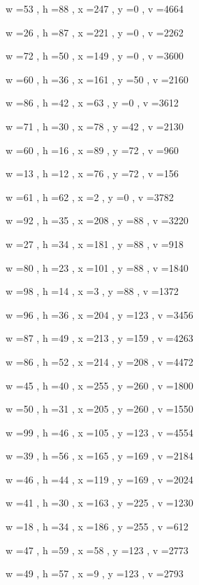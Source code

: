 \documentclass[11pt]{article}
\begin{document}
w =53 , h =88 , x =247 , y =0 , v =4664
\par
w =26 , h =87 , x =221 , y =0 , v =2262
\par
w =72 , h =50 , x =149 , y =0 , v =3600
\par
w =60 , h =36 , x =161 , y =50 , v =2160
\par
w =86 , h =42 , x =63 , y =0 , v =3612
\par
w =71 , h =30 , x =78 , y =42 , v =2130
\par
w =60 , h =16 , x =89 , y =72 , v =960
\par
w =13 , h =12 , x =76 , y =72 , v =156
\par
w =61 , h =62 , x =2 , y =0 , v =3782
\par
w =92 , h =35 , x =208 , y =88 , v =3220
\par
w =27 , h =34 , x =181 , y =88 , v =918
\par
w =80 , h =23 , x =101 , y =88 , v =1840
\par
w =98 , h =14 , x =3 , y =88 , v =1372
\par
w =96 , h =36 , x =204 , y =123 , v =3456
\par
w =87 , h =49 , x =213 , y =159 , v =4263
\par
w =86 , h =52 , x =214 , y =208 , v =4472
\par
w =45 , h =40 , x =255 , y =260 , v =1800
\par
w =50 , h =31 , x =205 , y =260 , v =1550
\par
w =99 , h =46 , x =105 , y =123 , v =4554
\par
w =39 , h =56 , x =165 , y =169 , v =2184
\par
w =46 , h =44 , x =119 , y =169 , v =2024
\par
w =41 , h =30 , x =163 , y =225 , v =1230
\par
w =18 , h =34 , x =186 , y =255 , v =612
\par
w =47 , h =59 , x =58 , y =123 , v =2773
\par
w =49 , h =57 , x =9 , y =123 , v =2793
\par
\newpage
\end{document}
